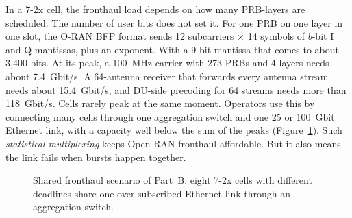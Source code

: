 In a 7-2x cell, the fronthaul load depends on how many PRB-layers are scheduled. The number of user bits does not set it. For one PRB on one layer in one slot, the O-RAN BFP format sends 12 subcarriers $\times$ 14 symbols of $b$-bit I and Q mantissas, plus an exponent. With a 9-bit mantissa that comes to about 3{,}400 bits. At its peak, a 100~MHz carrier with 273 PRBs and 4 layers needs about 7.4~Gbit/s. A 64-antenna receiver that forwards every antenna stream needs about 15.4~Gbit/s, and DU-side precoding for 64 streams needs more than 118~Gbit/s. Cells rarely peak at the same moment. Operators use this by connecting many cells through one aggregation switch and one 25 or 100~Gbit Ethernet link, with a capacity well below the sum of the peaks (Figure~\ref{fig:shared}). Such \emph{statistical multiplexing} keeps Open RAN fronthaul affordable. But it also means the link fails when bursts happen together.

\begin{figure}[H]
\centering
{}
\caption{Shared fronthaul scenario of Part~B: eight 7-2x cells with different deadlines share one over-subscribed Ethernet link through an aggregation switch.}
\label{fig:shared}
\end{figure}

